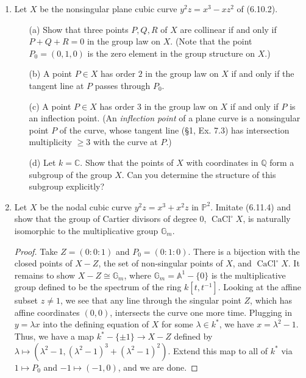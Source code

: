 \documentclass{article}
\newcommand{\PP}{\mathbb{P}}
\newcommand{\A}{\mathbb{A}}
\newcommand{\C}{\mathbb{C}}
\newcommand{\Q}{\mathbb{Q}}
\DeclareMathOperator{\cacl}{CaCl}
\begin{document}
\begin{enumerate} [label=\textbf{\arabic*.}, leftmargin=0em]
\item Let $X$ be the nonsingular plane cubic curve $y^2 z = x^3 - xz^2$ of (6.10.2).
\begin{itemize}
    \item[(a)] Show that three points $P, Q, R$ of $X$ are collinear if and only if $P + Q + R = 0$ in the group law on $X$. (Note that the point $P_0 = (0, 1, 0)$ is the zero element in the group structure on $X$.)
    \item[(b)] A point $P \in X$ has order $2$ in the group law on $X$ if and only if the tangent line at $P$ passes through $P_0$.
    \item[(c)] A point $P \in X$ has order $3$ in the group law on $X$ if and only if $P$ is an inflection point. (An \textit{inflection point} of a plane curve is a nonsingular point $P$ of the curve, whose tangent line (\S 1, Ex. 7.3) has intersection multiplicity $\geq 3$ with the curve at $P$.)
    \item[(d)] Let $k = \C$. Show that the points of $X$ with coordinates in $\Q$ form a subgroup of the group $X$. Can you determine the structure of this subgroup explicitly?
\end{itemize}

\item Let $X$ be the nodal cubic curve $y^2 z = x^3 + x^2 z$ in $\PP^2$. Imitate (6.11.4) and show that the group of Cartier divisors of degree $0$, $\cacl^\circ X$, is naturally isomorphic to the multiplicative group $\mathbb{G}_m$.

\begin{proof}
   Take $Z = (0:0:1)$ and $P_0 = (0:1:0)$. There is a bijection with the closed points of $X - Z$, the set of non-singular points of $X$, and $\cacl^\circ X$. It remains to show $X - Z \cong \mathbb{G}_m$, where $\mathbb{G}_m = \A^1 - \{ 0 \}$ is the multiplicative group defined to be the spectrum of the ring $k[t, t^{-1}]$. Looking at the affine subset $z \neq 1$, we see that any line through the singular point $Z$, which has affine coordinates $(0, 0)$, intersects the curve one more time. Plugging in $y = \lambda x$ into the defining equation of $X$ for some $\lambda \in k^*$, we have $x = \lambda^2  - 1$. Thus, we have a map $k^* - \{ \pm 1 \} \to X - Z$ defined by $\lambda \mapsto (\lambda^2 - 1, (\lambda^2 - 1)^3 + (\lambda^2 - 1)^2)$. Extend this map to all of $k^*$ via $1 \mapsto P_0$ and $-1 \mapsto (-1, 0)$, and we are done.
\end{proof}


\end{enumerate}
\end{document}
